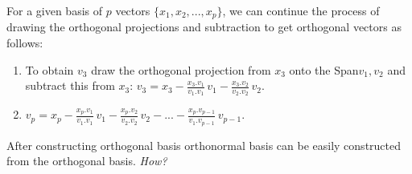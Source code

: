 \documentclass[aima104_lecturenotes_ku.tex]{subfiles}
\begin{document}
 For a given basis of $p$ vectors $\{x_1,x_2, ..., x_p\}$, we can continue the process of drawing the orthogonal projections and subtraction to get orthogonal vectors as follows:
 \begin{enumerate}
 \item To obtain $v_3$ draw the orthogonal projection from $x_3$ onto the Span$v_1,v_2$ and \\[1mm] subtract this from $x_3$: $\displaystyle v_3 = x_3 - \frac{x_3.v_1}{v_1.v_1} \, v_1 - \frac{x_3.v_2}{v_2.v_2} \, v_2$.

  \item $\displaystyle v_p = x_p - \frac{x_p.v_1}{v_1.v_1} \, v_1 - \frac{x_p.v_2}{v_2.v_2} \, v_2 - ... - \frac{x_p.v_{p-1}}{v_1.v_{p-1}} \, v_{p-1}$.
  \end{enumerate}

  \begin{remark}
    After constructing orthogonal basis orthonormal basis can be easily constructed from the orthogonal basis. \textit{How?}
  \end{remark}
\end{document}
